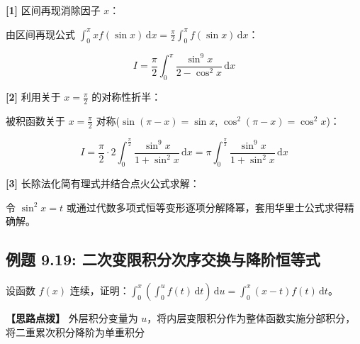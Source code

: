 \documentclass[11pt,a4paper,UTF8]{ctexart}
\begin{document}
\begin{solbox}[分步推导与答题规范]
\textbf{[1]} 区间再现消除因子 $x$：

由区间再现公式 $\int_0^\pi x f(\sin x)\,\mathrm{d}x = \frac{\pi}{2}\int_0^\pi f(\sin x)\,\mathrm{d}x$：


\begin{equation*}
I = \frac{\pi}{2}\int_0^\pi \frac{\sin^9 x}{2-\cos^2 x}\,\mathrm{d}x
\end{equation*}


\textbf{[2]} 利用关于 $x = \frac{\pi}{2}$ 的对称性折半：

被积函数关于 $x = \frac{\pi}{2}$ 对称($\sin(\pi-x) = \sin x$, $\cos^2(\pi-x) = \cos^2 x$)：


\begin{equation*}
I = \frac{\pi}{2} \cdot 2\int_0^{\frac{\pi}{2}} \frac{\sin^9 x}{1 + \sin^2 x}\,\mathrm{d}x = \pi \int_0^{\frac{\pi}{2}} \frac{\sin^9 x}{1+\sin^2 x}\,\mathrm{d}x
\end{equation*}


\textbf{[3]} 长除法化简有理式并结合点火公式求解：

令 $\sin^2 x = t$ 或通过代数多项式恒等变形逐项分解降幂，套用华里士公式求得精确解。
\end{solbox}


\subsection{例题 9.19: 二次变限积分次序交换与降阶恒等式}

设函数 $f(x)$ 连续，证明：$\int_0^x \left(\int_0^u f(t)\,\mathrm{d}t\right)\,\mathrm{d}u = \int_0^x (x-t)f(t)\,\mathrm{d}t$。

\textbf{\color{DeepPurple}【思路点拨】} 外层积分变量为 $u$，将内层变限积分作为整体函数实施分部积分，将二重累次积分降阶为单重积分
\end{document}
